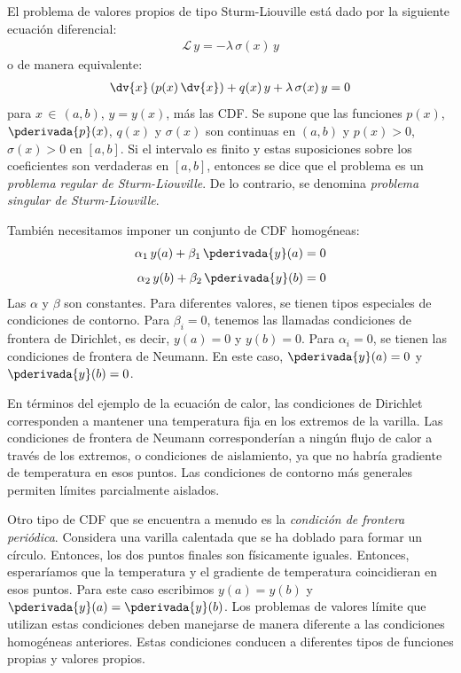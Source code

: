 El problema de valores propios de tipo Sturm-Liouville está dado por la siguiente ecuación diferencial:
\begin{align*}
\mathcal{L} \, y = - \lambda \, \sigma(x) \, y
\end{align*}
o de manera equivalente:
\begin{align}
\dv{x} \left( p(x) \, \dv{x} \right) + q(x) \, y + \lambda \, \sigma (x) \, y = 0
\label{eq:ecuacion_04_03}
\end{align}
para $x \, \in \, (a, b)$, $y = y (x)$, más las CDF. Se supone que las funciones $p (x)$, $\pderivada{p} (x)$, $q (x)$ y $\sigma (x)$ son continuas en $(a, b)$ y $p (x) > 0$, $\sigma (x) > 0$ en $[a , b]$. Si el intervalo es finito y estas suposiciones sobre los coeficientes son verdaderas en $[a, b]$, entonces se dice que el problema es un \emph{problema regular de Sturm-Liouville}. De lo contrario, se denomina \emph{problema singular de Sturm-Liouville}.
\par
También necesitamos imponer un conjunto de CDF homogéneas:
\begin{align}
\begin{aligned}
\alpha_{1} \, y(a) + \beta_{1} \, \pderivada{y} (a) &= 0 \\[0.5em]
\alpha_{2} \, y(b) + \beta_{2} \, \pderivada{y} (b) &= 0
\end{aligned}
\label{eq:ecuacion_04_04}
\end{align}
Las $\alpha$ y $\beta$ son constantes. Para diferentes valores, se tienen tipos especiales de condiciones de contorno. Para $\beta_{i} = 0$, tenemos las llamadas condiciones de frontera de Dirichlet, es decir, $y (a) = 0$ y $y (b) = 0$. Para $\alpha_{i} = 0$, se tienen las condiciones de frontera de Neumann. En este caso, $\pderivada{y} (a) = 0$ y $\pderivada{y} (b) = 0$.
\par
En términos del ejemplo de la ecuación de calor, las condiciones de Dirichlet corresponden a mantener una temperatura fija en los extremos de la varilla. Las condiciones de frontera de Neumann corresponderían a ningún flujo de calor a través de los extremos, o condiciones de aislamiento, ya que no habría gradiente de temperatura en esos puntos. Las condiciones de contorno más generales permiten límites parcialmente aislados.
\par
Otro tipo de CDF que se encuentra a menudo es la \emph{condición de frontera periódica}. Considera una varilla calentada que se ha doblado para formar un círculo. Entonces, los dos puntos finales son físicamente iguales. Entonces, esperaríamos que la temperatura y el gradiente de temperatura coincidieran en esos puntos. Para este caso escribimos $y (a) = y (b)$ y $\pderivada{y} (a) = \pderivada{y} (b)$. Los problemas de valores límite que utilizan estas condiciones deben manejarse de manera diferente a las condiciones homogéneas anteriores. Estas condiciones conducen a diferentes tipos de funciones propias y valores propios.
